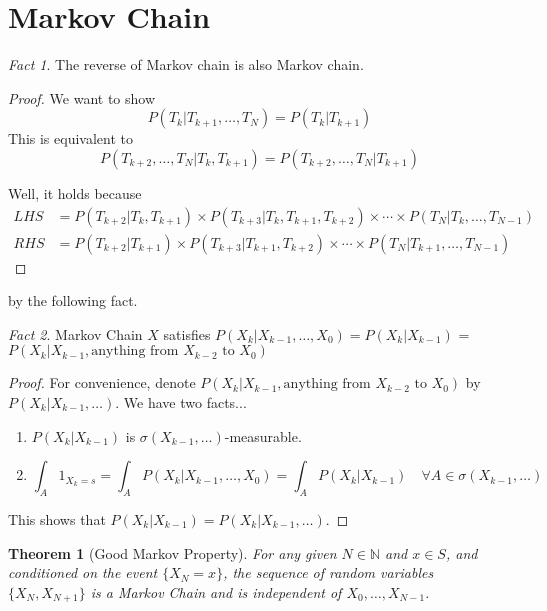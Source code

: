 \documentclass[11pt,reqno]{amsart}
\newtheorem{theorem}{Theorem}
\theoremstyle{remark}
\newtheorem{fact}{Fact}
\begin{document}
\section{Markov Chain}
\begin{fact}
The reverse of Markov chain is also Markov chain.
\end{fact}
\begin{proof}
We want to show
\[
P(T_k | T_{k+1}, \ldots, T_N) = P(T_k | T_{k+1})
\]
This is equivalent to
\[
P(T_{k+2}, \ldots, T_N | T_k, T_{k+1}) = P(T_{k+2}, \ldots, T_N | T_{k+1})
\]

Well, it holds because
\[
\begin{aligned}
LHS &= P(T_{k+2} | T_k, T_{k+1}) \times P(T_{k+3} | T_k, T_{k+1}, T_{k+2}) \times \cdots \times P(T_N | T_k, \ldots, T_{N-1}) \\
RHS &= P(T_{k+2} | T_{k+1}) \times P(T_{k+3} | T_{k+1}, T_{k+2}) \times \cdots \times P(T_N | T_{k+1}, \ldots, T_{N-1})
\end{aligned}
\]
\end{proof}

by the following fact. 


\begin{fact}
Markov Chain \( X \) satisfies \( P(X_k | X_{k-1}, \ldots, X_0) = P(X_k | X_{k-1}) \) = \( P(X_k | X_{k-1}, \text{anything from } X_{k-2} \text{ to } X_0) \)
\end{fact}

\begin{proof}
For convenience, denote \( P(X_k | X_{k-1}, \text{anything from } X_{k-2} \text{ to } X_0) \) by \( P(X_k | X_{k-1}, \ldots) \). We have two facts...
\begin{enumerate}
\item \( P(X_k | X_{k-1}) \) is \( \sigma(X_{k-1}, \ldots) \)-measurable.
\item 
\[
\int_A 1_{X_k = s} = \int_A P(X_k | X_{k-1}, \ldots, X_0) = \int_A P(X_k | X_{k-1}) \quad \forall A \in \sigma(X_{k-1}, \ldots)
\]
\end{enumerate}
This shows that \( P(X_k | X_{k-1}) = P(X_k | X_{k-1}, \ldots) \).
\end{proof}

\begin{theorem}[Good Markov Property]
For any given \( N \in \mathbb{N} \) and \( x \in S \), and conditioned on the event \( \{X_N = x\} \), the sequence of random variables \( \{X_N, X_{N+1}\} \) is a Markov Chain and is independent of \( X_0, \ldots, X_{N-1} \).
\end{theorem}
\end{document}

